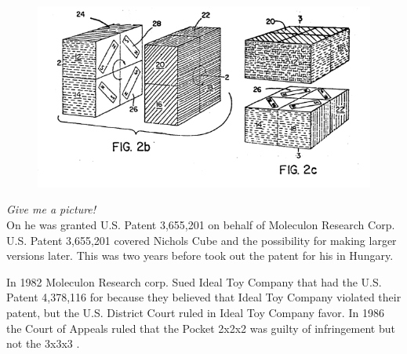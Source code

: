 \begin{figure}
	\centering
		\includegraphics[scale=0.8]{input/pics/Nicholspatent2.png}
	\caption{}
	\label{fig:Nicholspatent2}
\end{figure}


\textit{Give me a picture!} \\

On  he was granted U.S. Patent 3,655,201 on behalf of Moleculon Research Corp. U.S. Patent 3,655,201 covered Nichols Cube and the possibility for making larger versions later. This was two years before \erno{} took out the patent for his \rubik{} in Hungary. 

In 1982 Moleculon Research corp.  Sued Ideal Toy Company that had the U.S. Patent 4,378,116 for \rubik{} because they believed that Ideal Toy Company violated their patent, but the U.S. District Court ruled in Ideal Toy Company favor. In 1986 the Court of Appeals ruled that the Pocket \rubik{} 2x2x2 was guilty of infringement but not the 3x3x3 \rubik{}.

%